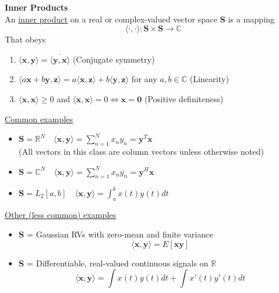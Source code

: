 \documentclass[12pt]{article}
\begin{document}
\color{ForestGreen}
\large{\textbf{Inner Products}}
\color{Black}\\
An \underline{inner product} on a real or complex-valued vector space \textbf{S} is a mapping
\begin{equation*}
    \langle \cdot,\cdot \rangle : \mathbf{S} \times \mathbf{S} \rightarrow \mathbb{C}
\end{equation*}
That obeys 
\begin{enumerate}
    \item  $\langle \mathbf{x}, \mathbf{y} \rangle = \overline{\langle \mathbf{y}, \mathbf{x} \rangle} $ (Conjugate symmetry)
    \item $\langle a\mathbf{x} + b\mathbf{y},\mathbf{z} \rangle = a\langle \mathbf{x}, \mathbf{z} \rangle + b \langle \mathbf{y}, \mathbf{z} \rangle$ for any $a, b \in \mathbb{C}$ (Linearity)
    \item $\langle \mathbf{x}, \mathbf{x} \rangle \geq 0 $ and $\langle \mathbf{x}, \mathbf{x} \rangle = 0 \iff \mathbf{x} = \mathbf{0}$ (Positive definiteness)
\end{enumerate}
\underline{Common examples} 
\begin{itemize}
    \item $\mathbf{S} = \mathbb{R}^N \quad \langle \mathbf{x}, \mathbf{y} \rangle = \sum_{n=1}^N x_n y_n = \mathbf{y}^T \mathbf{x}$ \\ (All vectors in this class are column vectors unless otherwise noted)
    \item $\mathbf{S} = \mathbb{C}^N \quad \langle \mathbf{x}, \mathbf{y} \rangle = \sum_{n=1}^N x_n \overline{y_n} = \mathbf{y}^H \mathbf{x}$
    \item $\mathbf{S} = L_2[a,b] \quad \langle \mathbf{x}, \mathbf{y} \rangle = \int_a^b x(t)\overline{y(t)} dt$
\end{itemize}
\underline{Other (less common) examples} 
\begin{itemize}
    \item \textbf{S} = Gaussian RVs with zero-mean and finite variance \\
    \begin{equation*}
        \langle \mathbf{x}, \mathbf{y} \rangle = E[\mathbf{x}\mathbf{y}]
    \end{equation*}
    \item \textbf{S} = Differentiable, real-valued continuous signals on $\mathbb{R}$ \\
    \begin{equation*}
        \langle \mathbf{x}, \mathbf{y} \rangle = \int x(t)y(t) dt + \int x'(t) y'(t) dt    
    \end{equation*}
\end{itemize}
\end{document}
